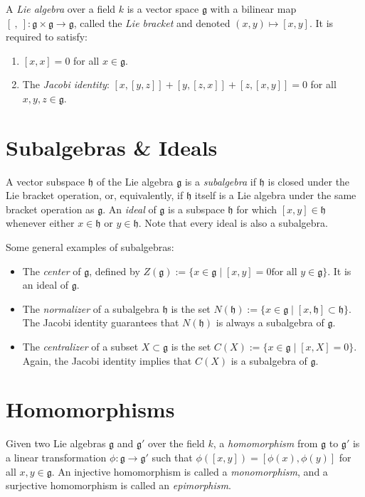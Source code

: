 \documentclass[12pt]{article}
\newcommand{\g}{\mathfrak{g}}
\newcommand{\h}{\mathfrak{h}}
\begin{document}
A {\em Lie algebra} over a field $k$ is a vector space $\mathfrak{g}$ with a bilinear map $[\ ,\ ] : \mathfrak{g}\times\mathfrak{g}\to\mathfrak{g}$, called the {\em Lie bracket} and denoted $(x,y)\mapsto [x,y]$.  It is required to satisfy:
\begin{enumerate}
\item $[x,x] = 0$ for all $x\in\mathfrak{g}$.
\item The {\em Jacobi identity}: $[x,[y,z]] + [y,[z,x]] + [z,[x,y]] = 0$ for all $x,y,z\in\mathfrak{g}$.
\end{enumerate}

\section{Subalgebras \& Ideals}

A vector subspace $\h$ of the Lie algebra $\g$ is a {\em subalgebra} if $\h$ is closed under the Lie bracket operation, or, equivalently, if $\h$ itself is a Lie algebra under the same bracket operation as $\g$. An {\em ideal} of $\g$ is a subspace $\h$ for which $[x,y] \in \h$ whenever either $x \in \h$ or $y \in \h$. Note that every ideal is also a subalgebra.

Some general examples of subalgebras:
\begin{itemize}
\item The {\em center} of $\g$, defined by $Z(\g) := \{x \in \g \mid [x,y] = 0 \text{for all } y \in \g\}$. It is an ideal of $\g$.
\item The {\em normalizer} of a subalgebra $\h$ is the set $N(\h) := \{x \in \g \mid [x,\h] \subset \h\}$. The Jacobi identity guarantees that $N(\h)$ is always a subalgebra of $\g$.
\item The {\em centralizer} of a subset $X \subset \g$ is the set $C(X) := \{x \in \g \mid [x,X] = 0\}$. Again, the Jacobi identity implies that $C(X)$ is a subalgebra of $\g$.
\end{itemize}

\section{Homomorphisms}
Given two Lie algebras $\g$ and $\g'$ over the field $k$, a {\em homomorphism} from $\g$ to $\g'$ is a linear transformation $\phi: \g \to \g'$ such that $\phi([x,y]) = [\phi(x),\phi(y)]$ for all $x,y \in \g$. An injective homomorphism is called a {\em monomorphism}, and a surjective homomorphism is called an {\em epimorphism}.
\end{document}

